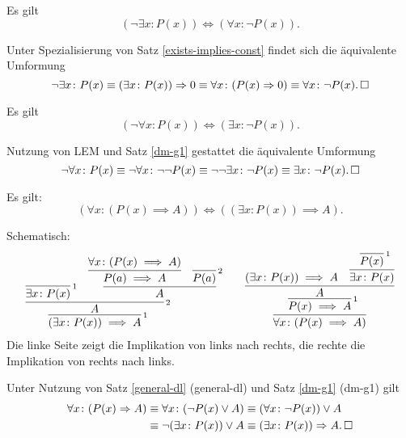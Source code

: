 \begin{Satz}%
\label{dm-g1} Es gilt
\[(\neg\exists x\colon P(x))\iff (\forall x\colon \neg P(x)).\]
\end{Satz}
\begin{Beweis} Unter Spezialisierung von Satz \ref{exists-implies-const}
findet sich die äquivalente Umformung%
\[\neg\exists x\colon P(x)\equiv (\exists x\colon P(x))\Rightarrow 0
\equiv \forall x\colon (P(x)\Rightarrow 0)
\equiv \forall x\colon \neg P(x).\,\square\]
\end{Beweis}
\begin{Satz}%
\label{dm-g2} Es gilt
\[(\neg\forall x\colon P(x))\iff (\exists x\colon \neg P(x)).\]
\end{Satz}
\begin{Beweis}
Nutzung von LEM und Satz \ref{dm-g1} gestattet die äquivalente
Umformung%
\[\neg\forall x\colon P(x)
\equiv\neg\forall x\colon \neg\neg P(x)
\equiv\neg\neg\exists x\colon \neg P(x)
\equiv\exists x\colon \neg P(x).\,\square\]
\end{Beweis}

\begin{Satz}\label{exists-implies-const}
Es gilt:
\[(\forall x\colon (P(x)\implies A)) \iff ((\exists x\colon P(x))\implies A).\]
\end{Satz}
\begin{Beweis} Schematisch:\\
\[\begin{array}{c@{\qquad}c}
\infer[\infernote{1}]{(\exists x\colon P(x))\implies A}{
  \infer[\infernote{2}]{A}{
    \infer[\infernote{1}]{\exists x\colon P(x)}{}
    &
    \infer{A}{
      \infer{P(a)\implies A}{\forall x\colon (P(x)\implies A)}
      & \infer[\infernote{2}]{P(a)}{}}
  }
}
&
\infer{\forall x\colon (P(x)\implies A)}{
  \infer[\infernote{1}]{P(x)\implies A}{
    \infer{A}{
      (\exists x\colon P(x))\implies A
      & \infer{\exists x\colon P(x)}{
          \infer[\infernote{1}]{P(x)}{}}}}}
\end{array}
\]
Die linke Seite zeigt die Implikation von links nach rechts,
die rechte die Implikation von rechts nach links.\,\qedsymbol
\end{Beweis}
\begin{Beweis}
Unter Nutzung von Satz \ref{general-dl} (general-dl)
und Satz \ref{dm-g1} (dm-g1) gilt
\begin{align*}
\forall x\colon (P(x)\Rightarrow A)
&\equiv \forall x\colon (\neg P(x)\lor A)
\equiv (\forall x\colon \neg P(x))\lor A\\
&\equiv \neg (\exists x\colon P(x))\lor A
\equiv (\exists x\colon P(x))\Rightarrow A.\,\square
\end{align*}
\end{Beweis}


